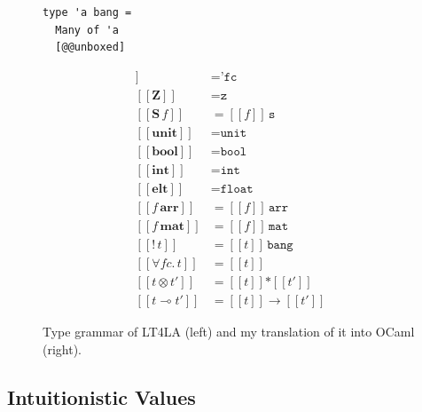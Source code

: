 \begin{figure}[tp]
\begin{minipage}{.3\textwidth}
\begin{verbatim}
type 'a bang =
  Many of 'a
  [@@unboxed]
        \end{verbatim}
    \end{minipage}
    \begin{minipage}{.3\textwidth}
        \begin{align*}
            [\![ f\!c ]\!] &= \texttt{'fc} \\
            [\![ \textbf{Z} ]\!] &= \texttt{z}\\
            [\![ \textbf{S} \, f ]\!] &= [\![ f ]\!]\, \texttt{s}\\
            [\![ \textbf{unit} ]\!] &= \texttt{unit}\\
            [\![ \textbf{bool} ]\!] &= \texttt{bool}\\
            [\![ \textbf{int} ]\!] &= \texttt{int}\\
            [\![ \textbf{elt} ]\!] &= \texttt{float}\\
            [\![ f\, \textbf{arr} ]\!] &= [\![ f ]\!]\, \texttt{arr}\\
            [\![ f\, \textbf{mat} ]\!] &= [\![ f ]\!]\, \texttt{mat}\\
            [\![ \textbf{!} \, t ]\!] &= [\![ t ]\!]\, \texttt{bang}\\
            [\![ \forall f\!c.\, t ]\!] &= [\![ t ]\!]\\
            [\![ t \otimes t' ]\!] &= [\![ t ]\!] \texttt{*} [\![ t' ]\!]\\
            [\![ t \multimap t' ]\!] &= [\![ t ]\!] \rightarrow [\![ t' ]\!]
        \end{align*}
    \end{minipage}
    \caption{Type grammar of LT4LA (left) and my translation of it
        into OCaml (right).}\label{fig:type_grammar}
\end{figure}

\subsection{Intuitionistic Values}

